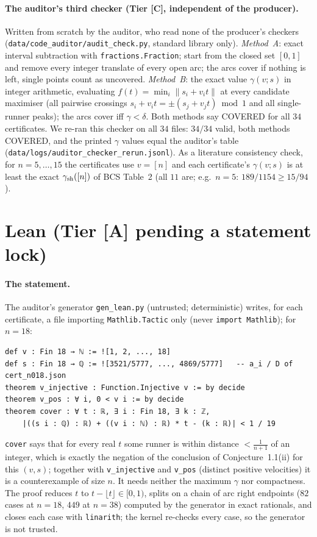 \documentclass[10pt]{article}
\newcommand{\tier}[1]{\textsf{[#1]}}
\newcommand{\tA}{\tier{A}}
\newcommand{\tC}{\tier{C}}
\newcommand{\lean}[1]{\texttt{#1}}
\begin{document}
\paragraph{The auditor's third checker (Tier \tC{}, independent of the producer).} Written from scratch by the auditor, who read none of the producer's checkers (\texttt{data/code\_auditor/audit\_check.py}, standard library only). \emph{Method~A}: exact interval subtraction with \texttt{fractions.Fraction}; start from the closed set $[0,1]$ and remove every integer translate of every open arc; the arcs cover if nothing is left, single points count as uncovered. \emph{Method~B}: the exact value $\gamma(v;s)$ in integer arithmetic, evaluating $f(t)=\min_i\|s_i+v_it\|$ at every candidate maximiser (all pairwise crossings $s_i+v_it=\pm(s_j+v_jt)\bmod1$ and all single-runner peaks); the arcs cover iff $\gamma<\delta$. Both methods say COVERED for all $34$ certificates. We re-ran this checker on all $34$ files: $34/34$ valid, both methods COVERED, and the printed $\gamma$ values equal the auditor's table (\texttt{data/logs/auditor\_checker\_rerun.jsonl}). As a literature consistency check, for $n=5,\dots,15$ the certificates use $v=[n]$ and each certificate's $\gamma(v;s)$ is at least the exact $\gamma_{\rm sh}([n])$ of BCS Table~2 (all $11$ are; e.g.\ $n=5$: $189/1154\ge15/94$).

\section{Lean (Tier \tA{} pending a statement lock)}\label{sec:lean}
\paragraph{The statement.} The auditor's generator \texttt{gen\_lean.py} (untrusted; deterministic) writes, for each certificate, a file importing \texttt{Mathlib.Tactic} only (never \texttt{import Mathlib}); for $n=18$:
\begin{lstlisting}
def v : Fin 18 → ℕ := ![1, 2, ..., 18]
def s : Fin 18 → ℚ := ![3521/5777, ..., 4869/5777]   -- a_i / D of cert_n018.json
theorem v_injective : Function.Injective v := by decide
theorem v_pos : ∀ i, 0 < v i := by decide
theorem cover : ∀ t : ℝ, ∃ i : Fin 18, ∃ k : ℤ,
    |((s i : ℚ) : ℝ) + ((v i : ℕ) : ℝ) * t - (k : ℝ)| < 1 / 19
\end{lstlisting}
\lean{cover} says that for every real $t$ some runner is within distance $<\frac1{n+1}$ of an integer, which is exactly the negation of the conclusion of Conjecture~1.1(ii) for this $(v,s)$; together with \lean{v\_injective} and \lean{v\_pos} (distinct positive velocities) it is a counterexample of size $n$. It needs neither the maximum $\gamma$ nor compactness. The proof reduces $t$ to $t-\lfloor t\rfloor\in[0,1)$, splits on a chain of arc right endpoints ($82$ cases at $n=18$, $449$ at $n=38$) computed by the generator in exact rationals, and closes each case with \texttt{linarith}; the kernel re-checks every case, so the generator is not trusted.
\end{document}
